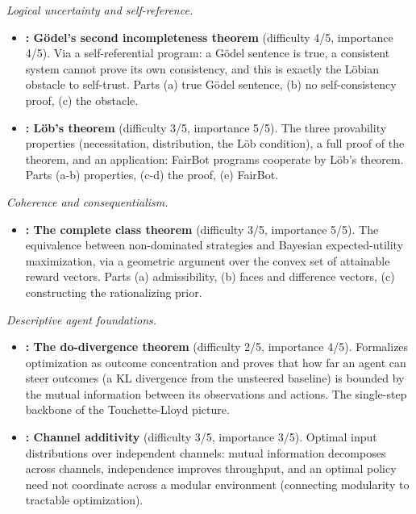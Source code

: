 \documentclass[11pt]{article}
\begin{document}
\emph{Logical uncertainty and self-reference.}

\begin{itemize}
\item
  \textbf{: Gödel's second incompleteness theorem} (difficulty 4/5, importance 4/5). Via a self-referential program: a Gödel sentence is true, a consistent system cannot prove its own consistency, and this is exactly the Löbian obstacle to self-trust. Parts (a) true Gödel sentence, (b) no self-consistency proof, (c) the obstacle.
\item
  \textbf{: Löb's theorem} (difficulty 3/5, importance 5/5). The three provability properties (necessitation, distribution, the Löb condition), a full proof of the theorem, and an application: FairBot programs cooperate by Löb's theorem. Parts (a-b) properties, (c-d) the proof, (e) FairBot.
\end{itemize}

\emph{Coherence and consequentialism.}

\begin{itemize}
\item
  \textbf{: The complete class theorem} (difficulty 3/5, importance 5/5). The equivalence between non-dominated strategies and Bayesian expected-utility maximization, via a geometric argument over the convex set of attainable reward vectors. Parts (a) admissibility, (b) faces and difference vectors, (c) constructing the rationalizing prior.
\end{itemize}

\emph{Descriptive agent foundations.}

\begin{itemize}
\item
  \textbf{: The do-divergence theorem} (difficulty 2/5, importance 4/5). Formalizes optimization as outcome concentration and proves that how far an agent can steer outcomes (a KL divergence from the unsteered baseline) is bounded by the mutual information between its observations and actions. The single-step backbone of the Touchette-Lloyd picture.
\item
  \textbf{: Channel additivity} (difficulty 3/5, importance 3/5). Optimal input distributions over independent channels: mutual information decomposes across channels, independence improves throughput, and an optimal policy need not coordinate across a modular environment (connecting modularity to tractable optimization).
\end{itemize}
\end{document}
